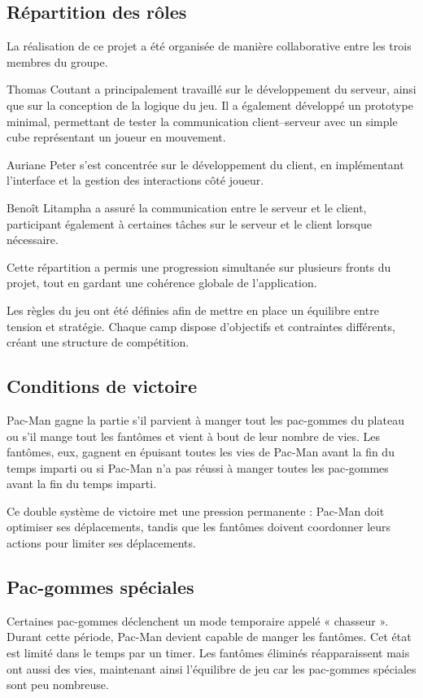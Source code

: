 \documentclass[a4paper, 11pt]{article}
\begin{document}
\subsection{Répartition des rôles}

La réalisation de ce projet a été organisée de manière collaborative entre les trois membres du groupe. 

Thomas Coutant a principalement travaillé sur le développement du serveur, ainsi que sur la conception de la logique du jeu. Il a également développé un prototype minimal, permettant de tester la communication client–serveur avec un simple cube représentant un joueur en mouvement.

Auriane Peter s’est concentrée sur le développement du client, en implémentant l’interface et la gestion des interactions côté joueur.

Benoît Litampha a assuré la communication entre le serveur et le client, participant également à certaines tâches sur le serveur et le client lorsque nécessaire. 

Cette répartition a permis une progression simultanée sur plusieurs fronts du projet, tout en gardant une cohérence globale de l’application.

Les règles du jeu ont été définies afin de mettre en place un équilibre entre tension et stratégie.
Chaque camp dispose d’objectifs et contraintes différents, créant une structure de compétition.

\subsection{Conditions de victoire}

Pac-Man gagne la partie s’il parvient à manger tout les pac-gommes du plateau ou s’il mange tout les fantômes et vient à bout de leur nombre de vies. 
Les fantômes, eux, gagnent en épuisant toutes les vies de Pac-Man avant la fin du temps imparti ou si Pac-Man n'a pas réussi à manger toutes les pac-gommes avant la fin du temps imparti.

Ce double système de victoire met une pression permanente : Pac-Man doit optimiser ses déplacements, tandis que les fantômes doivent coordonner leurs actions pour limiter ses déplacements.

\subsection{Pac-gommes spéciales}

Certaines pac-gommes déclenchent un mode temporaire appelé « chasseur ».
Durant cette période, Pac-Man devient capable de manger les fantômes.
Cet état est limité dans le temps par un timer.
Les fantômes éliminés réapparaissent mais ont aussi des vies, maintenant ainsi l’équilibre de jeu car les pac-gommes spéciales sont peu nombreuse.
\end{document}
